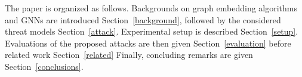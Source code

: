 The paper is organized as follows.
Backgrounds on graph embedding algorithms and GNNs are introduced Section~\ref{background}, followed by the considered threat models Section~\ref{attack}. %
Experimental setup is described Section~\ref{setup}.
Evaluations of the proposed attacks are then given Section~\ref{evaluation} before related work Section~\ref{related}
Finally, concluding remarks are given Section~\ref{conclusions}.
